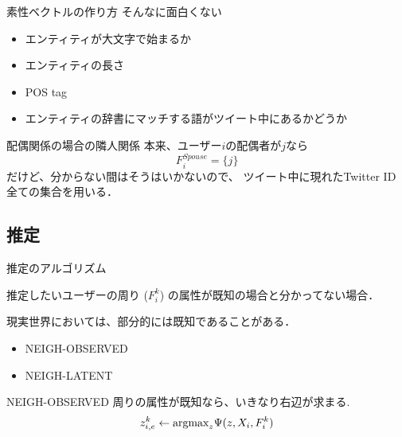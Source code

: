 \documentclass[12pt, dvipdfmx, default, cjk]{beamer}
\begin{document}
\begin{frame}{素性ベクトルの作り方}
  そんなに面白くない

  \begin{itemize}
    \item エンティティが大文字で始まるか
    \item エンティティの長さ
    \item POS tag
    \item \alert{エンティティの辞書にマッチする語がツイート中にあるかどうか}
  \end{itemize}
\end{frame}

\begin{frame}{配偶関係の場合の隣人関係}
  本来、ユーザー$i$の配偶者が$j$なら
  \[ F_i^{Spouse} = \{ j \} \]
  だけど、分からない間はそうはいかないので、
  ツイート中に現れたTwitter ID 全ての集合を用いる．
\end{frame}

\subsection{推定}

\begin{frame}[fragile]{推定のアルゴリズム}

  推定したいユーザーの周り ($F^k_i$) の属性が既知の場合と分かってない場合．

  現実世界においては、部分的には既知であることがある．

  \begin{itemize}
    \item NEIGH-OBSERVED
    \item NEIGH-LATENT
  \end{itemize}
\end{frame}

\begin{frame}{NEIGH-OBSERVED}
  周りの属性が既知なら、いきなり右辺が求まる.
          \[
            z^k_{i,e} \leftarrow \textrm{argmax}_z \Psi(z, X_i, F^k_i)
          \]
\end{frame}
\end{document}
